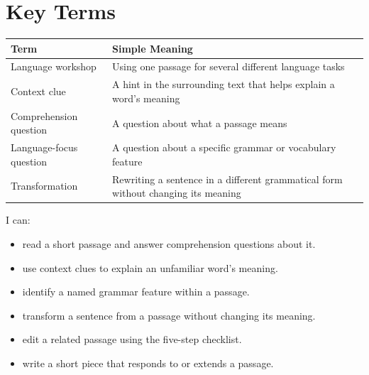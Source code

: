 \section{Key Terms}
\begin{table}[h!]
\centering
\begin{tabular}{|l|p{9cm}|}
\hline
\textbf{Term} & \textbf{Simple Meaning} \\
\hline
Language workshop & Using one passage for several different language tasks \\
Context clue & A hint in the surrounding text that helps explain a word's meaning \\
Comprehension question & A question about what a passage means \\
Language-focus question & A question about a specific grammar or vocabulary feature \\
Transformation & Rewriting a sentence in a different grammatical form without changing its meaning \\
\hline
\end{tabular}
\end{table}

\begin{selfcheck}
I can:
\begin{itemize}
    \item read a short passage and answer comprehension questions about it.
    \item use context clues to explain an unfamiliar word's meaning.
    \item identify a named grammar feature within a passage.
    \item transform a sentence from a passage without changing its meaning.
    \item edit a related passage using the five-step checklist.
    \item write a short piece that responds to or extends a passage.
\end{itemize}
\end{selfcheck}